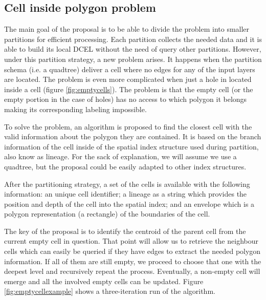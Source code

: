 \subsection{Cell inside polygon problem} \label{sec:anomalies}
The main goal of the proposal is to be able to divide the problem into smaller partitions for efficient processing.  Each partition collects the needed data and it is able to build its local DCEL without the need of query other partitions.  However, under this partition strategy, a new problem arises.  It happens when the partition schema (i.e. a quadtree) deliver a cell where no edges for any of the input layers are located.  The problem is even more complicated when just a hole in located inside a cell (figure \ref{fig:emptycells}).  The problem is that the empty cell (or the empty portion in the case of holes) has no access to which polygon it belongs making its corresponding labeling impossible.  


To solve the problem, an algorithm is proposed to find the closest cell with the valid information about the polygon they are contained.  It is based on the branch information of the cell inside of the spatial index structure used during partition, also know as lineage.  For the sack of explanation, we will assume we use a quadtree, but the proposal could be easily adapted to other index structures.

After the partitioning strategy, a set of the cells is available with the following information: an unique cell identifier; a lineage as a string which provides the position and depth of the cell into the spatial index; and an envelope which is a polygon representation (a rectangle) of the boundaries of the cell.

The key of the proposal is to identify the centroid of the parent cell from the current empty cell in question.  That point will allow us to retrieve the neighbour cells which can easily be queried if they have edges to extract the needed polygon information.  If all of them are still empty, we proceed to choose that one with the deepest level and recursively repeat the process.  Eventually, a non-empty cell will emerge and all the involved empty cells can be updated.  Figure \ref{fig:emptycellexample} shows a three-iteration run of the algorithm.

